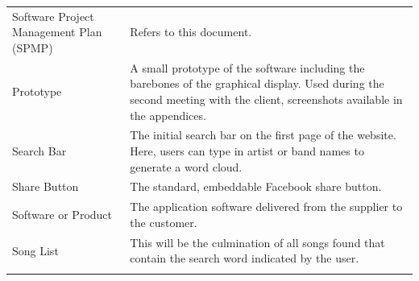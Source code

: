 \documentclass[]{article}
\begin{document}
\begin{longtable}[c]{@{}ll@{}}
\begin{minipage}[t]{0.47\columnwidth}
Software Project Management Plan (SPMP)
\end{minipage} & \begin{minipage}[t]{0.47\columnwidth}\raggedright
Refers to this document.
\end{minipage}
\\\addlinespace
\begin{minipage}[t]{0.47\columnwidth}\raggedright
Prototype
\end{minipage} & \begin{minipage}[t]{0.47\columnwidth}\raggedright
A small prototype of the software including the barebones of the
graphical display. Used during the second meeting with the client,
screenshots available in the appendices.
\end{minipage}
\\\addlinespace
\begin{minipage}[t]{0.47\columnwidth}\raggedright
Search Bar
\end{minipage} & \begin{minipage}[t]{0.47\columnwidth}\raggedright
The initial search bar on the first page of the website. Here, users can
type in artist or band names to generate a word cloud.
\end{minipage}
\\\addlinespace
\begin{minipage}[t]{0.47\columnwidth}\raggedright
Share Button
\end{minipage} & \begin{minipage}[t]{0.47\columnwidth}\raggedright
The standard, embeddable Facebook share button.
\end{minipage}
\\\addlinespace
\begin{minipage}[t]{0.47\columnwidth}\raggedright
Software or Product
\end{minipage} & \begin{minipage}[t]{0.47\columnwidth}\raggedright
The application software delivered from the supplier to the customer.
\end{minipage}
\\\addlinespace
\begin{minipage}[t]{0.47\columnwidth}\raggedright
Song List
\end{minipage} & \begin{minipage}[t]{0.47\columnwidth}\raggedright
This will be the culmination of all songs found that contain the search
word indicated by the user.
\end{minipage}
\\\addlinespace

\end{longtable}
\end{document}
